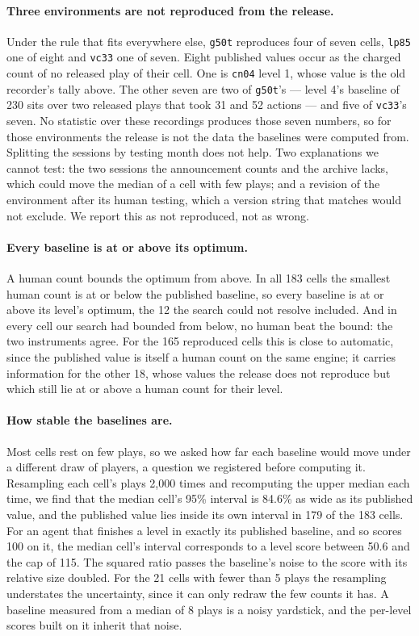 \documentclass[11pt]{article}
\newcommand{\code}[1]{\texttt{#1}}
\begin{document}
\paragraph{Three environments are not reproduced from the release.} Under the
rule that fits everywhere else, \code{g50t} reproduces four of seven cells,
\code{lp85} one of eight and \code{vc33} one of seven. Eight published values
occur as the charged count of no released play of their cell. One is \code{cn04} level 1,
whose value is the old recorder's tally above. The other seven are two of
\code{g50t}'s --- level 4's baseline of 230 sits over two released plays that
took 31 and 52 actions --- and five of \code{vc33}'s seven. No statistic over
these recordings produces those seven numbers, so for those environments the
release is not the data the baselines were computed from. Splitting the
sessions by testing month does not help. Two explanations we cannot test: the
two sessions the announcement counts and the archive lacks, which could move the
median of a cell with few plays; and a revision of the environment after its human testing, which a version string
that matches would not exclude. We report this as not reproduced, not as
wrong.

\paragraph{Every baseline is at or above its optimum.} A human count bounds
the optimum from above. In all 183 cells the smallest human count is at or
below the published baseline, so every baseline is at or above its level's
optimum, the 12 the search could not resolve included. And in every cell
our search had bounded from below, no human beat the bound: the two
instruments agree. For the 165 reproduced cells this is close to automatic,
since the published value is itself a human count on the same engine; it
carries information for the other 18, whose values the release does not
reproduce but which still lie at or above a human count for their level.

\paragraph{How stable the baselines are.} Most cells rest on few plays, so we
asked how far each baseline would move under a different draw of players, a
question we registered before computing it. Resampling each cell's plays 2,000
times and recomputing the upper median each time, we find that the median
cell's 95\%
interval is 84.6\% as wide as its published value, and the published value
lies inside its own interval in 179 of the 183 cells. For an agent that
finishes a level in exactly its published baseline, and so scores 100 on it, the
median cell's interval corresponds to a level score between 50.6 and the cap of
115. The squared ratio passes the baseline's noise to the score with its
relative size doubled. For the 21 cells with fewer than 5 plays the resampling
understates the uncertainty, since it can only redraw the few counts it has. A
baseline measured from a median of 8 plays is a noisy yardstick, and the
per-level scores built on it inherit that noise.
\end{document}
